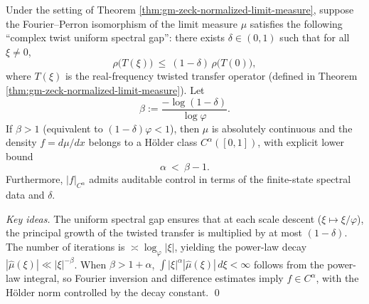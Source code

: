 \begin{proposition}
\begin{theorem}\label{thm:gm-holder-regularity-from-gap}
Under the setting of Theorem \ref{thm:gm-zeck-normalized-limit-measure}, suppose the Fourier--Perron isomorphism of the limit measure \(\mu\) satisfies the following ``complex twist uniform spectral gap'': there exists \(\delta\in(0,1)\) such that for all \(\xi\ne 0\),
\[
\rho\!\bigl(T(\xi)\bigr)\ \le\ (1-\delta)\,\rho\!\bigl(T(0)\bigr),
\]
where \(T(\xi)\) is the real-frequency twisted transfer operator (defined in Theorem \ref{thm:gm-zeck-normalized-limit-measure}).
Let
\[
\beta:=\frac{-\log(1-\delta)}{\log\varphi}.
\]
If \(\beta>1\) (equivalent to \((1-\delta)\varphi<1\)), then \(\mu\) is absolutely continuous and the density \(f=d\mu/dx\) belongs to a H\"older class \(C^\alpha([0,1])\), with explicit lower bound
\[
\alpha\ <\ \beta-1.
\]
Furthermore, \(|f|_{C^\alpha}\) admits auditable control in terms of the finite-state spectral data and \(\delta\).
\end{theorem}

\begin{proof}[Key ideas]
The uniform spectral gap ensures that at each scale descent (\(\xi\mapsto \xi/\varphi\)), the principal growth of the twisted transfer is multiplied by at most \((1-\delta)\).
The number of iterations is \(\asymp \log_\varphi|\xi|\), yielding the power-law decay
\(
|\widehat\mu(\xi)|\ll |\xi|^{-\beta}
\).
When \(\beta>1+\alpha\), \(\int |\xi|^{\alpha}|\widehat\mu(\xi)|\,d\xi<\infty\) follows from the power-law integral,
so Fourier inversion and difference estimates imply \(f\in C^\alpha\), with the H\"older norm controlled by the decay constant. \qed
\end{proof}


\end{proposition}

